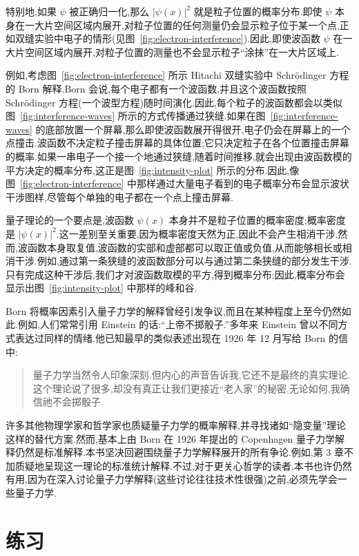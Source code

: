 特别地,如果 $\psi$ 被正确归一化,那么 $|\psi(x)|^2$ 就是粒子位置的概率分布.即使 $\psi$ 本身在一大片空间区域内展开,对粒子位置的任何测量仍会显示粒子位于某一个点,正如双缝实验中电子的情形(见图~\ref{fig:electron-interference}).因此,即使波函数 $\psi$ 在一大片空间区域内展开,对粒子位置的测量也不会显示粒子“涂抹”在一大片区域上.

例如,考虑图~\ref{fig:electron-interference} 所示 Hitachi 双缝实验中 Schrödinger 方程的 Born 解释.Born 会说,每个电子都有一个波函数,并且这个波函数按照 Schrödinger 方程(一个波型方程)随时间演化.因此,每个粒子的波函数都会以类似图~\ref{fig:interference-waves} 所示的方式传播通过狭缝.如果在图~\ref{fig:interference-waves} 的底部放置一个屏幕,那么即使波函数展开得很开,电子仍会在屏幕上的一个点撞击.波函数不决定粒子撞击屏幕的具体位置;它只决定粒子在各个位置撞击屏幕的概率.如果一串电子一个接一个地通过狭缝,随着时间推移,就会出现由波函数模的平方决定的概率分布,这正是图~\ref{fig:intensity-plot} 所示的分布.因此,像图~\ref{fig:electron-interference} 中那样通过大量电子看到的电子概率分布会显示波状干涉图样,尽管每个单独的电子都在一个点上撞击屏幕.

量子理论的一个要点是,波函数 $\psi(x)$ 本身并不是粒子位置的概率密度;概率密度是 $|\psi(x)|^2$.这一差别至关重要,因为概率密度天然为正,因此不会产生相消干涉.然而,波函数本身取复值,波函数的实部和虚部都可以取正值或负值,从而能够相长或相消干涉.例如,通过第一条狭缝的波函数部分可以与通过第二条狭缝的部分发生干涉.只有完成这种干涉后,我们才对波函数取模的平方,得到概率分布;因此,概率分布会显示出图~\ref{fig:intensity-plot} 中那样的峰和谷.

Born 将概率因素引入量子力学的解释曾经引发争议,而且在某种程度上至今仍然如此.例如,人们常常引用 Einstein 的话:“上帝不掷骰子.”多年来 Einstein 曾以不同方式表达过同样的情绪.他已知最早的类似表述出现在 1926 年 12 月写给 Born 的信中:

\begin{quote}
量子力学当然令人印象深刻.但内心的声音告诉我,它还不是最终的真实理论.这个理论说了很多,却没有真正让我们更接近“老人家”的秘密.无论如何,我确信祂不会掷骰子.
\end{quote}

许多其他物理学家和哲学家也质疑量子力学的概率解释,并寻找诸如“隐变量”理论这样的替代方案.然而,基本上由 Born 在 1926 年提出的 Copenhagen 量子力学解释仍然是标准解释.本书坚决回避围绕量子力学解释展开的所有争论.例如,第 3 章不加质疑地呈现这一理论的标准统计解释.不过,对于更关心哲学的读者,本书也许仍然有用,因为在深入讨论量子力学解释(这些讨论往往技术性很强)之前,必须先学会一些量子力学.

\section{练习}\label{sec:chapter1-exercises}

